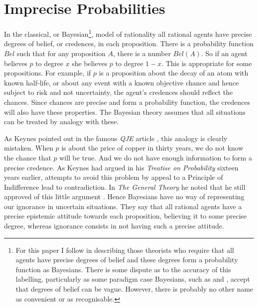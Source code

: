 \section{Imprecise Probabilities}
In the classical, or Bayesian\footnote{For this paper I follow \citet{Walley1991} in describing those theorists who require that all agents have precise degrees of belief and these degrees form a probability function as Bayesians. There is some dispute as to the accuracy of this labelling, particularly as some paradigm case Bayesians, such as \citet{Jeffrey1983} and \citet{vanFraassen1990}, accept that degrees of belief can be vague. However, there is probably no other name as convenient or as recognisable.}, model of rationality all rational agents have precise degrees of belief, or credences, in each proposition. There is a probability function \(Bel\) such that for any proposition \(A\), there is a number \(Bel(A)\). So if an agent believes \(p\) to degree \(x\) she believes \(p\) to degree \(1-x\). This is appropriate for some propositions. For example, if \(p\) is a proposition about the decay of an atom with known half-life, or about any event with a known objective chance and hence subject to risk and not uncertainty, the agent's credences should reflect the chances. Since chances are precise and form a probability function, the credences will also have these properties. The Bayesian theory assumes that all situations can be treated by analogy with these.

As Keynes pointed out in the famous \textit{QJE} article \citep{Keynes1937}, this analogy is clearly mistaken. When \(p\) is about the price of copper in thirty years, we do not know the chance that \(p\) will be true. And we do not have enough information to form a precise credence. As Keynes had argued in his \textit{Treatise on Probability} sixteen years earlier, attempts to avoid this problem by appeal to a Principle of Indifference lead to contradiction. In \textit{The General Theory} he noted that he still approved of this little argument \citep[152]{Keynes1936}. Hence Bayesians have no way of representing our ignorance in uncertain situations. They say that all rational agents have a precise epistemic attitude towards each proposition, believing it to some precise degree, whereas ignorance consists in not having such a precise attitude.

